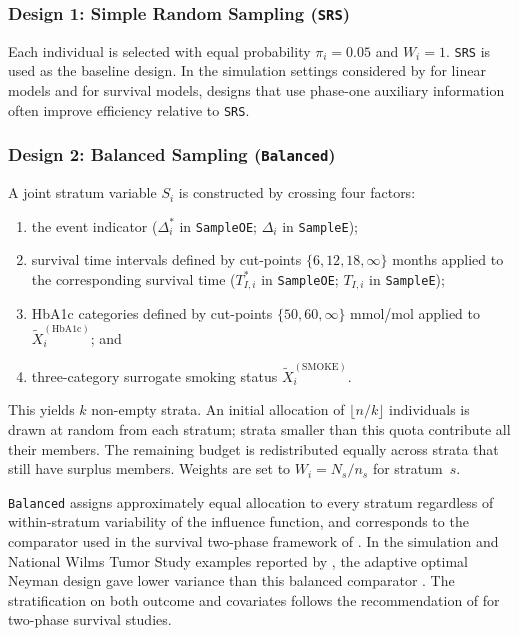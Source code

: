 \subsubsection{Design 1: Simple Random Sampling (\texttt{SRS})}

Each individual is selected with equal probability $\pi_i = 0.05$ and $W_i = 1$. \texttt{SRS} is used as the baseline design. In the simulation settings considered by \citet{amorim2021two} for linear models and \citet{han2021two} for survival models, designs that use phase-one auxiliary information often improve efficiency relative to \texttt{SRS}.

\subsubsection{Design 2: Balanced Sampling (\texttt{Balanced})}

A joint stratum variable $S_i$ is constructed by crossing four factors:
\begin{enumerate}[nosep]
  \item the event indicator ($\Delta^*_i$ in \texttt{SampleOE}; $\Delta_i$ in \texttt{SampleE});
  \item survival time intervals defined by cut-points $\{6, 12, 18, \infty\}$ months applied to the corresponding survival time ($T^*_{I,i}$ in \texttt{SampleOE}; $T_{I,i}$ in \texttt{SampleE});
  \item HbA1c categories defined by cut-points $\{50, 60, \infty\}$ mmol/mol applied to $\tilde{X}_i^{(\mathrm{HbA1c})}$; and
  \item three-category surrogate smoking status $\tilde{X}_i^{(\mathrm{SMOKE})}$.
\end{enumerate}
This yields $k$ non-empty strata. An initial allocation of $\lfloor n/k \rfloor$ individuals is drawn at random from each stratum; strata smaller than this quota contribute all their members. The remaining budget is redistributed equally across strata that still have surplus members. Weights are set to $W_i = N_s / n_s$ for stratum~$s$.

\texttt{Balanced} assigns approximately equal allocation to every stratum regardless of within-stratum variability of the influence function, and corresponds to the comparator used in the survival two-phase framework of \citet{han2021two}. In the simulation and National Wilms Tumor Study examples reported by \citet{han2021two}, the adaptive optimal Neyman design gave lower variance than this balanced comparator \citep[Tables~1--2]{han2021two}. The stratification on both outcome and covariates follows the recommendation of \citet{breslow1999design} for two-phase survival studies.

